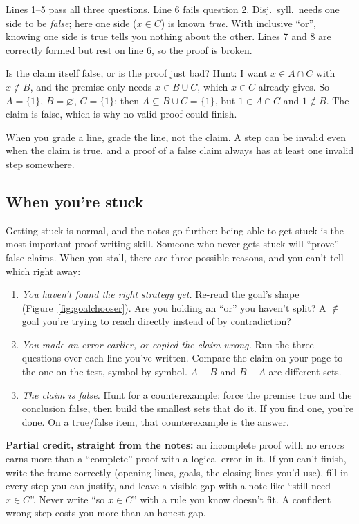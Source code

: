 Lines 1--5 pass all three questions. Line 6 fails question 2. Disj.\ syll.\ needs one side to be \emph{false}; here one side ($x\in C$) is known \emph{true}. With inclusive ``or'', knowing one side is true tells you nothing about the other. Lines 7 and 8 are correctly formed but rest on line 6, so the proof is broken.

Is the claim itself false, or is the proof just bad? Hunt: I want $x\in A\cap C$ with $x\notin B$, and the premise only needs $x\in B\cup C$, which $x\in C$ already gives. So $A=\{1\}$, $B=\varnothing$, $C=\{1\}$: then $A\subseteq B\cup C=\{1\}$, but $1\in A\cap C$ and $1\notin B$. The claim is false, which is why no valid proof could finish.

When you grade a line, grade the line, not the claim. A step can be invalid even when the claim is true, and a proof of a false claim always has at least one invalid step somewhere.

\subsection{When you're stuck}

Getting stuck is normal, and the notes go further: being able to get stuck is the most important proof-writing skill. Someone who never gets stuck will ``prove'' false claims. When you stall, there are three possible reasons, and you can't tell which right away:

\begin{enumerate}
  \item \emph{You haven't found the right strategy yet.} Re-read the goal's shape (Figure~\ref{fig:goalchooser}). Are you holding an ``or'' you haven't split? A $\notin$ goal you're trying to reach directly instead of by contradiction?
  \item \emph{You made an error earlier, or copied the claim wrong.} Run the three questions over each line you've written. Compare the claim on your page to the one on the test, symbol by symbol. $A-B$ and $B-A$ are different sets.
  \item \emph{The claim is false.} Hunt for a counterexample: force the premise true and the conclusion false, then build the smallest sets that do it. If you find one, you're done. On a true/false item, that counterexample is the answer.
\end{enumerate}

\begin{notebox}
\textbf{Partial credit, straight from the notes:} an incomplete proof with no errors earns more than a ``complete'' proof with a logical error in it. If you can't finish, write the frame correctly (opening lines, goals, the closing lines you'd use), fill in every step you can justify, and leave a visible gap with a note like ``still need $x\in C$''. Never write ``so $x\in C$'' with a rule you know doesn't fit. A confident wrong step costs you more than an honest gap.
\end{notebox}

